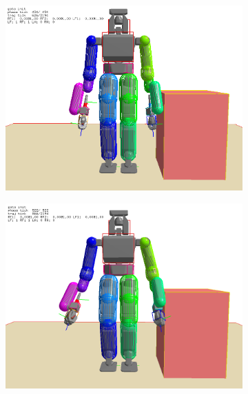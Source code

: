 \documentclass[letterpaper, 10 pt, conference]{ieeeconf}  %
\begin{document}
\begin{figure}[h]
\begin{center}
    \begin{subfigure}[h]{0.45\columnwidth}
        \includegraphics[width=\columnwidth]{pictures/mirror_1}
        \label{fig:mirror1}
    \end{subfigure}
    \begin{subfigure}[h]{0.45\columnwidth}
        \includegraphics[width=\columnwidth]{pictures/mirror_2}
        \label{fig:mirror2}
    \end{subfigure}
    \begin{subfigure}[h]{0.45\columnwidth}

\end{subfigure}
\end{center}
\end{figure}
\end{document}
